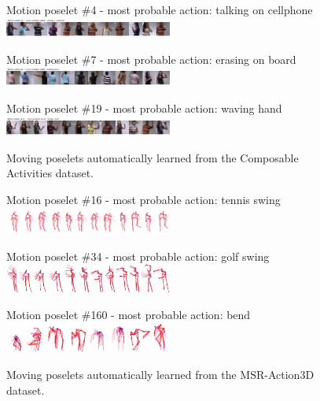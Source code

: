 \begin{figure}[tb]
\begin{center}
\scriptsize
 Motion poselet \#4 - most probable action: talking on cellphone\\
 \includegraphics[trim=0 0 0 0.35cm, clip, width=0.49\textwidth]{Fig/poselets1}

 Motion poselet \#7 - most probable action: erasing on board\\
 \includegraphics[trim=0 0 0 0.35cm, clip, width=0.49\textwidth]{Fig/poselets2}

 Motion poselet \#19 - most probable action: waving hand\\
 \includegraphics[trim=0 0 0 0.35cm, clip, width=0.49\textwidth]{Fig/poselets3}
\end{center}
\vspace{-4mm}
\caption{
\footnotesize
Moving poselets automatically learned from the Composable Activities
dataset.}
\label{fig:poselets_img}
\end{figure}


\begin{figure}[th]
\begin{center}
\scriptsize
 Motion poselet \#16 - most probable action: tennis swing\\
 \includegraphics[trim=0 0 0cm 0cm, clip, width=0.49\textwidth]{Fig/poselets4}

 Motion poselet \#34 - most probable action: golf swing\\
 \includegraphics[trim=0 0 0cm 0cm,clip, width=0.49\textwidth]{Fig/poselets5}

 Motion poselet \#160 - most probable action: bend\\
 \includegraphics[trim=0 0 0cm 0cm, clip, width=0.49\textwidth]{Fig/poselets6}

\end{center}
\vspace{-4mm}
\caption{
\footnotesize
Moving poselets automatically learned from the MSR-Action3D
dataset.}
\label{fig:poselets_skel}
\end{figure}

